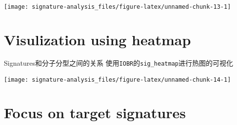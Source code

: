 \documentclass[
  12pt,
]{book}
\newenvironment{Shaded}{\begin{snugshade}}{\end{snugshade}}
\newcommand{\AttributeTok}[1]{\textcolor[rgb]{0.13,0.29,0.53}{#1}}
\newcommand{\DecValTok}[1]{\textcolor[rgb]{0.00,0.00,0.81}{#1}}
\newcommand{\FunctionTok}[1]{\textcolor[rgb]{0.13,0.29,0.53}{\textbf{#1}}}
\newcommand{\NormalTok}[1]{#1}
\newcommand{\OtherTok}[1]{\textcolor[rgb]{0.56,0.35,0.01}{#1}}
\newcommand{\SpecialCharTok}[1]{\textcolor[rgb]{0.81,0.36,0.00}{\textbf{#1}}}
\newcommand{\StringTok}[1]{\textcolor[rgb]{0.31,0.60,0.02}{#1}}
\begin{document}
\begin{Shaded}
\end{Shaded}

\begin{center}\texttt{[image: signature-analysis\_files/figure-latex/unnamed-chunk-13-1]} \end{center}

\hypertarget{visulization-using-heatmap}{%
\section{Visulization using heatmap}\label{visulization-using-heatmap}}

Signatures和分子分型之间的关系
使用\texttt{IOBR}的\texttt{sig\_heatmap}进行热图的可视化

\begin{Shaded}
\end{Shaded}

\begin{center}\texttt{[image: signature-analysis\_files/figure-latex/unnamed-chunk-14-1]} \end{center}

\hypertarget{focus-on-target-signatures}{%
\section{Focus on target signatures}\label{focus-on-target-signatures}}
\end{document}
